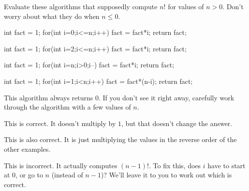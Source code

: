 \newpage
\begin{eval}
Evaluate these algorithms that supposedly compute $n!$ for values of $n>0$. Don't worry about
what they do when $n\leq 0$.
\begin{ssolenum}
\item
\begin{code}

    int fact = 1;
    for(int i=0;i<=n;i++) {
        fact = fact*i;
    }
    return fact;
\end{code}
\evallinetwo
\item
\begin{code}

    int fact = 1;
    for(int i=2;i<=n;i++) {
        fact = fact*i;
    }
    return fact;
\end{code}
\evallinetwo
\item
\begin{code}

    int fact = 1;
    for(int i=n;i>0;i--) {
        fact = fact*i;
    }
    return fact;
\end{code}
\evallinetwo
\item
\begin{code}

    int fact = 1;
    for(int i=1;i<n;i++) {
        fact = fact*(n-i);
    }
    return fact;
\end{code}
\evallinetwo
\end{ssolenum}
\begin{answer}
\begin{solevalenum}
\item
This algorithm always returns $0$.  If you don't see it right away, carefully work through the algorithm
with a few values of $n$.
\item
This is correct.  It doesn't multiply by $1$, but that doesn't change the answer.
\item
This is also correct.  It is just multiplying the values in the reverse order of the other examples.
\item
This is incorrect.  It actually computes $(n-1)!$.
To fix this, does $i$ have to start at $0$, or go to $n$ (instead of $n-1$)?  
We'll leave it to you to work out which is correct.
\end{solevalenum}
\end{answer}
\end{eval}

